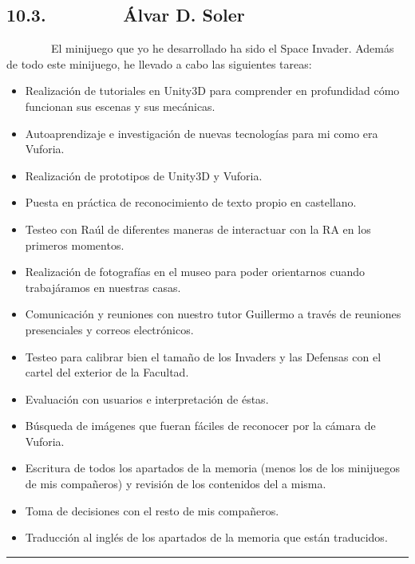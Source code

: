 \documentclass[]{article}
\begin{document}
\subsection{10.3.~~~~~~~~Álvar D. Soler}\label{h.2zbgiuw}

~~~~~~~~El minijuego que yo he desarrollado ha sido el Space Invader.
Además de todo este minijuego, he llevado a cabo las siguientes tareas:

\begin{itemize}
\itemsep1pt\parskip0pt
\item
  Realización de tutoriales en Unity3D para comprender en profundidad
  cómo funcionan sus escenas y sus mecánicas.
\item
  Autoaprendizaje e investigación de nuevas tecnologías para mi como era
  Vuforia.
\item
  Realización de prototipos de Unity3D y Vuforia.
\item
  Puesta en práctica de reconocimiento de texto propio en castellano.
\item
  Testeo con Raúl de diferentes maneras de interactuar con la RA en los
  primeros momentos.
\item
  Realización de fotografías en el museo para poder orientarnos cuando
  trabajáramos en nuestras casas.
\item
  Comunicación y reuniones con nuestro tutor Guillermo a través de
  reuniones presenciales y correos electrónicos.
\item
  Testeo para calibrar bien el tamaño de los Invaders y las Defensas con
  el cartel del exterior de la Facultad.
\item
  Evaluación con usuarios e interpretación de éstas.
\item
  Búsqueda de imágenes que fueran fáciles de reconocer por la cámara de
  Vuforia.
\item
  Escritura de todos los apartados de la memoria (menos los de los
  minijuegos de mis compañeros) y revisión de los contenidos del a
  misma.
\item
  Toma de decisiones con el resto de mis compañeros.
\item
  Traducción al inglés de los apartados de la memoria que están
  traducidos.
\end{itemize}

\begin{center}\rule{3in}{0.4pt}\end{center}

\end{document}
